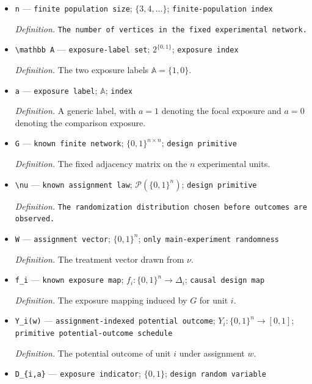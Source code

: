 \documentclass{article}
\begin{document}
\begin{itemize}
  \item \texttt{n} --- \texttt{finite population size}; \(\{3,4,\ldots\}\); \texttt{finite-\allowbreak{}population index}
  \par\smallskip\noindent\emph{Definition.} \texttt{The number of vertices in the fixed experimental network.}
  \item \texttt{\textbackslash{}\allowbreak{}mathbb A} --- \texttt{exposure-\allowbreak{}label set}; \(2^{\{0,1\}}\); \texttt{exposure index}
  \par\smallskip\noindent\emph{Definition.} The two exposure labels \(\mathbb A=\{1,0\}\).
  \item \texttt{a} --- \texttt{exposure label}; \(\mathbb A\); \texttt{index}
  \par\smallskip\noindent\emph{Definition.} A generic label, with \(a=1\) denoting the focal exposure and \(a=0\) denoting the comparison exposure.
  \item \texttt{G} --- \texttt{known finite network}; \(\{0,1\}^{n\times n}\); \texttt{design primitive}
  \par\smallskip\noindent\emph{Definition.} The fixed adjacency matrix on the \(n\) experimental units.
  \item \texttt{\textbackslash{}\allowbreak{}nu} --- \texttt{known assignment law}; \(\mathcal P(\{0,1\}^n)\); \texttt{design primitive}
  \par\smallskip\noindent\emph{Definition.} \texttt{The randomization distribution chosen before outcomes are observed.}
  \item \texttt{W} --- \texttt{assignment vector}; \(\{0,1\}^n\); \texttt{only main-\allowbreak{}experiment randomness}
  \par\smallskip\noindent\emph{Definition.} The treatment vector drawn from \(\nu\).
  \item \texttt{f\_\allowbreak{}i} --- \texttt{known exposure map}; \(f_i:\{0,1\}^n\to\Delta_i\); \texttt{causal design map}
  \par\smallskip\noindent\emph{Definition.} The exposure mapping induced by \(G\) for unit \(i\).
  \item \texttt{Y\_\allowbreak{}i(w)} --- \texttt{assignment-\allowbreak{}indexed potential outcome}; \(Y_i:\{0,1\}^n\to[0,1]\); \texttt{primitive potential-\allowbreak{}outcome schedule}
  \par\smallskip\noindent\emph{Definition.} The potential outcome of unit \(i\) under assignment \(w\).
  \item \texttt{D\_\allowbreak{}\{i,\allowbreak{}a\}\allowbreak{}} --- \texttt{exposure indicator}; \(\{0,1\}\); \texttt{design random variable}

\end{itemize}
\end{document}
